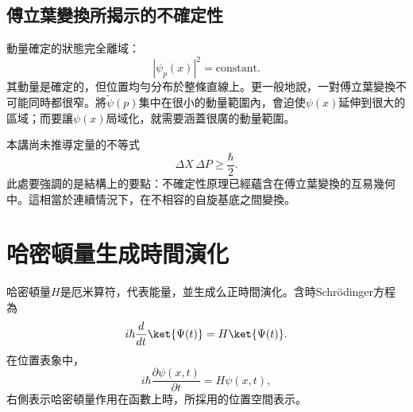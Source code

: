 \begin{classroomqa}
\end{classroomqa}

\begin{classroomqa}
\end{classroomqa}

\begin{classroomqa}
\end{classroomqa}

\subsection{傅立葉變換所揭示的不確定性}

動量確定的狀態完全離域：
\begin{equation}
|\psi_p(x)|^2=\text{constant}.
\end{equation}
其動量是確定的，但位置均勻分布於整條直線上。更一般地說，一對傅立葉變換不可能同時都很窄。將\(\widetilde{\psi}(p)\)集中在很小的動量範圍內，會迫使\(\psi(x)\)延伸到很大的區域；而要讓\(\psi(x)\)局域化，就需要涵蓋很廣的動量範圍。

本講尚未推導定量的不等式
\begin{equation}
\Delta X\,\Delta P\geq\frac{\hbar}{2}.
\end{equation}
此處要強調的是結構上的要點：不確定性原理已經蘊含在傅立葉變換的互易幾何中。這相當於連續情況下，在不相容的自旋基底之間變換。

\section{哈密頓量生成時間演化}

哈密頓量\(H\)是厄米算符，代表能量，並生成么正時間演化。含時Schr\"odinger方程為
\begin{equation}
i\hbar\frac{d}{dt}\ket{\Psi(t)}
=
H\ket{\Psi(t)}.
\label{eq:l9-abstract-schrodinger}
\end{equation}
在位置表象中，
\begin{equation}
i\hbar\frac{\partial\psi(x,t)}{\partial t}
=
H\psi(x,t),
\label{eq:l9-position-schrodinger}
\end{equation}
右側表示哈密頓量作用在函數上時，所採用的位置空間表示。

